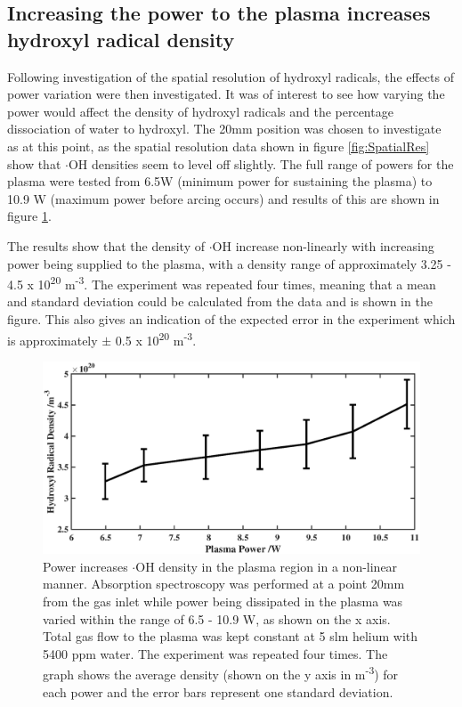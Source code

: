\documentclass[11pt, oneside]{article}   	%
\begin{document}
\subsection{Increasing the power to the plasma increases hydroxyl radical density}

Following investigation of the spatial resolution of hydroxyl radicals, the effects of power variation were then investigated.
It was of interest to see how varying the power would affect the density of hydroxyl radicals and the percentage dissociation of water to hydroxyl.
The 20mm position was chosen to investigate as at this point, as the spatial resolution data shown in figure \ref{fig:SpatialRes} show that $\cdot$OH densities seem to level off slightly. 
The full range of powers for the plasma were tested from 6.5W (minimum power for sustaining the plasma) to 10.9 W (maximum power before arcing occurs) and results of this are shown in figure \ref{fig:PowerVariation}.

The results show that the density of $\cdot$OH increase non-linearly with increasing power being supplied to the plasma, with a density range of approximately 3.25 - 4.5 x 10\textsuperscript{20} m\textsuperscript{-3}.
The experiment was repeated four times, meaning that a mean and standard deviation could be calculated from the data and is shown in the figure. 
This also gives an indication of the expected error in the experiment which is approximately $\pm$ 0.5 x 10\textsuperscript{20} m\textsuperscript{-3}.

\begin{figure}
    \centering
    \includegraphics[width=\textwidth]{Figures/PowerVariationBig.eps}
    \caption{Power increases $\cdot$OH density in the plasma region in a non-linear manner. Absorption spectroscopy was performed at a point 20mm from the gas inlet while power being dissipated in the plasma was varied within the range of 6.5 - 10.9 W, as shown on the x axis. Total gas flow to the plasma was kept constant at 5 slm helium with 5400 ppm water. The experiment was repeated four times. The graph shows the average density (shown on the y axis in m\textsuperscript{-3}) for each power and the error bars represent one standard deviation.}
    \label{fig:PowerVariation}
\end{figure}
\end{document}
